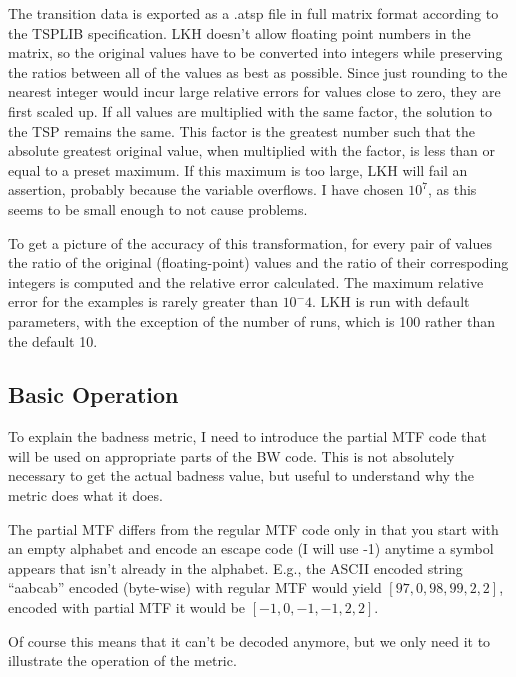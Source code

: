 \documentclass[a4paper]{scrreprt}
\begin{document}
The transition data is exported as a .atsp file in full matrix format according
to the TSPLIB specification\cite{reinelt1991tsplib}. LKH doesn't allow floating
point numbers in the matrix, so the original values have to be converted into
integers while preserving the ratios between all of the values as best as
possible. Since just rounding to the nearest integer would incur large relative
errors for values close to zero, they are first scaled up. If all values are
multiplied with the same factor, the solution to the TSP remains the same. This
factor is the greatest number such that the absolute greatest original value,
when multiplied with the factor, is less than or equal to a preset maximum. If
this maximum is too large, LKH will fail an assertion, probably because the
variable overflows. I have chosen \(10^7\), as this seems to be small
enough to not cause problems.

To get a picture of the accuracy of this transformation, for every pair of
values the ratio of the original (floating-point) values and the ratio of their
correspoding integers is computed and the relative error calculated. The maximum
relative error for the examples is rarely greater than \(10^-4\).
LKH is run with default parameters, with the exception of the number of runs,
which is 100 rather than the default 10.

\subsection{Basic Operation}

To explain the badness metric, I need to introduce the partial MTF code that
will be used on appropriate parts of the BW code. This is not absolutely
necessary to get the actual badness value, but useful to understand why the
metric does what it does.

The partial MTF differs from the regular MTF code only in that you start with an
empty alphabet and encode an escape code (I will use -1) anytime a symbol
appears that isn't already in the alphabet.
E.g., the ASCII encoded string ``aabcab'' encoded (byte-wise) with regular MTF
would yield \([97, 0, 98, 99, 2, 2]\), encoded with partial MTF it would be
\([-1, 0, -1, -1, 2, 2]\).


Of course this means that it can't be decoded anymore, but we only need it to
illustrate the operation of the metric.
\end{document}
